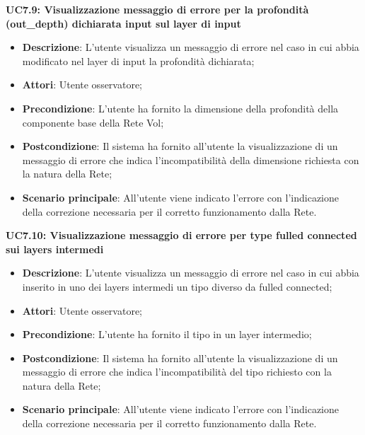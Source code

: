 \textbf{UC7.9: Visualizzazione messaggio di errore per la profondit\`a (out\_depth) dichiarata input sul layer di input}\mbox{}
\label{UC7.9: Visualizzazione messaggio di errore per la profondita dichiarata input sul layer di input}
\noindent
\begin{itemize}
\item \textbf{Descrizione}: L'utente visualizza un messaggio di errore nel caso in cui abbia modificato nel layer di input la profondit\`a dichiarata;
\item \textbf{Attori}: Utente osservatore;
\item \textbf{Precondizione}: L'utente ha fornito la dimensione della profondit\`a della componente base della Rete Vol;
\item \textbf{Postcondizione}: Il sistema ha fornito all'utente la visualizzazione di un messaggio di errore che indica l'incompatibilit\`a della dimensione richiesta con la natura della Rete;
\item \textbf{Scenario principale}: All'utente viene indicato l'errore con l'indicazione della correzione necessaria per il corretto funzionamento dalla Rete.
\end{itemize}


\textbf{UC7.10: Visualizzazione messaggio di errore per type fulled connected sui layers intermedi}\mbox{}
\label{UC7.10: Visualizzazione messaggio di errore per type fulled connected sui layers intermedi}
\noindent
\begin{itemize}
\item \textbf{Descrizione}: L'utente visualizza un messaggio di errore nel caso in cui abbia inserito in uno dei layers intermedi un tipo diverso da fulled connected;
\item \textbf{Attori}: Utente osservatore;
\item \textbf{Precondizione}: L'utente ha fornito il tipo in un layer intermedio;
\item \textbf{Postcondizione}: Il sistema ha fornito all'utente la visualizzazione di un messaggio di errore che indica l'incompatibilit\`a del tipo richiesto con la natura della Rete;
\item \textbf{Scenario principale}: All'utente viene indicato l'errore con l'indicazione della correzione necessaria per il corretto funzionamento dalla Rete.
\end{itemize}


